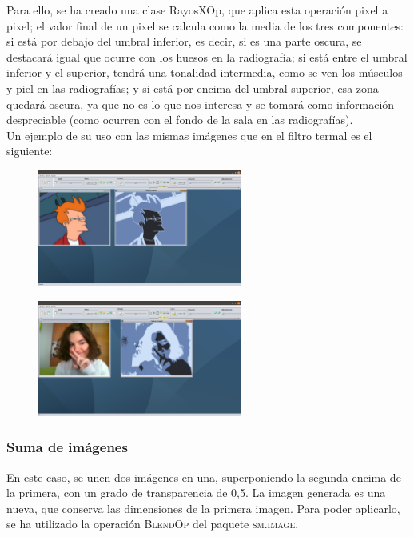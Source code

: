 \documentclass[11pt,a4paper]{article}
\begin{document}
Para ello, se ha creado una clase RayosXOp, que aplica esta operación pixel a pixel; el valor final de un pixel se calcula como la media de los tres componentes: si está por debajo del umbral inferior, es decir, si es una parte oscura, se destacará igual que ocurre con los huesos en la radiografía; si está entre el umbral inferior y el superior, tendrá una tonalidad intermedia, como se ven los músculos y piel en las radiografías; y si está por encima del umbral superior, esa zona quedará oscura, ya que no es lo que nos interesa y se tomará como información despreciable (como ocurren con el fondo de la sala en las radiografías).\\

Un ejemplo de su uso con las mismas imágenes que en el filtro termal es el siguiente:

\begin{figure}[H]
\centering
	\includegraphics[width=0.6\textwidth]{img/rayosx.png}
\end{figure}

\begin{figure}[H]
\centering
	\includegraphics[width=0.6\textwidth]{img/xray.png}
\end{figure}

\subsubsection{Suma de imágenes}
En este caso, se unen dos imágenes en una, superponiendo la segunda encima de la primera, con un grado de transparencia de 0,5. La imagen generada es una nueva, que conserva las dimensiones de la primera imagen. Para poder aplicarlo, se ha utilizado la operación \textsc{BlendOp} del paquete \textsc{sm.image}.\\
\end{document}
